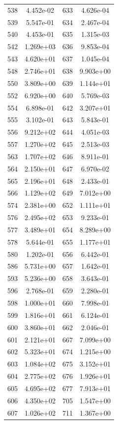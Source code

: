 \documentclass[12pt]{article}
\begin{document}
\begin{longtable}{@{}cccc@{}}
538 & 4.452e-02 & 633 & 4.626e-04 \\
539 & 5.547e-01 & 634 & 2.467e-04 \\
540 & 4.453e-01 & 635 & 1.315e-03 \\
542 & 1.269e+03 & 636 & 9.853e-04 \\
543 & 4.620e+01 & 637 & 1.045e-04 \\
548 & 2.746e+01 & 638 & 9.903e+00 \\
550 & 3.809e+00 & 639 & 1.144e+01 \\
552 & 6.920e+00 & 640 & 5.769e-03 \\
554 & 6.898e-01 & 642 & 3.207e+01 \\
555 & 3.102e-01 & 643 & 5.843e-01 \\
556 & 9.212e+02 & 644 & 4.051e-03 \\
557 & 1.270e+02 & 645 & 2.513e-03 \\
563 & 1.707e+02 & 646 & 8.911e-01 \\
564 & 2.150e+01 & 647 & 6.970e-02 \\
565 & 2.196e+01 & 648 & 2.433e-01 \\
566 & 1.129e+02 & 649 & 7.012e+00 \\
574 & 2.381e+00 & 652 & 1.111e+01 \\
576 & 2.495e+02 & 653 & 9.233e-01 \\
577 & 3.489e+01 & 654 & 8.289e+00 \\
578 & 5.644e-01 & 655 & 1.177e+01 \\
580 & 1.202e-01 & 656 & 6.442e-01 \\
586 & 5.731e+00 & 657 & 1.642e-01 \\
593 & 5.236e+00 & 658 & 3.643e-01 \\
596 & 2.768e-01 & 659 & 2.280e-01 \\
598 & 1.000e+01 & 660 & 7.998e-01 \\
599 & 1.816e+01 & 661 & 6.124e-01 \\
600 & 3.860e+01 & 662 & 2.046e-01 \\
601 & 2.121e+01 & 667 & 7.099e+00 \\
602 & 5.323e+01 & 674 & 1.215e+00 \\
603 & 1.084e+02 & 675 & 3.152e+01 \\
604 & 2.775e+02 & 676 & 1.926e+01 \\
605 & 4.695e+02 & 677 & 7.913e+01 \\
606 & 4.350e+02 & 705 & 1.547e+00 \\
607 & 1.026e+02 & 711 & 1.367e+00 \\

\end{longtable}
\end{document}
